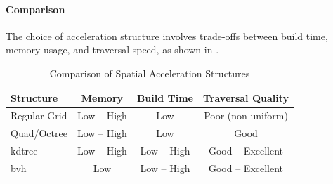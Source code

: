 \paragraph{Comparison}\label{par:comparison}

The choice of acceleration structure involves trade-offs between build time, memory usage, and traversal speed,
as shown in .

\begin{table}[t]
    \centering
    \caption{Comparison of Spatial Acceleration Structures\cite{tuwien_rendering_2020}}
    \label{tab:comparison-of-as}
    \begin{tabular}{lccc}
        \toprule
        \textbf{Structure} & \textbf{Memory} & \textbf{Build Time} & \textbf{Traversal Quality} \\
        \midrule
        Regular Grid & Low -- High & Low & Poor (non-uniform) \\
        Quad/Octree & Low -- High & Low & Good \\
        \gls{kdtree} & Low -- High & Low -- High & Good -- Excellent \\
        \gls{bvh} & Low & Low -- High & Good -- Excellent \\
        \bottomrule
    \end{tabular}
\end{table}

